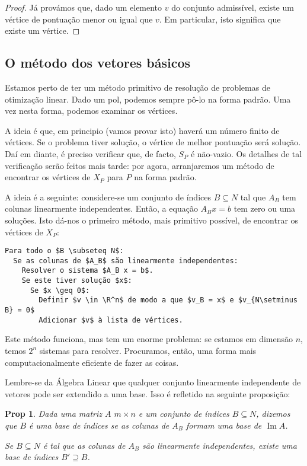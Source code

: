 \documentclass{article}
\DeclareMathOperator{\im}{Im}
\newcommand{\R}{\mathbb{R}}
\newtheorem{prop}{Prop}
\theoremstyle{definition}
\begin{document}
	\begin{proof}
	Já provámos que, dado um elemento $v$ do conjunto admissível, existe um vértice de pontuação menor ou igual que $v$. Em particular, isto significa que existe um vértice.
	\end{proof}
	
	\subsection{O método dos vetores básicos}
	
	Estamos perto de ter um método primitivo de resolução de problemas de otimização linear. Dado um pol, podemos sempre pô-lo na forma padrão. Uma vez nesta forma, podemos examinar os vértices.
	
	A ideia é que, em principio (vamos provar isto) haverá um número finito de vértices. Se o problema tiver solução, o vértice de melhor pontuação será solução. Daí em diante, é preciso verificar que, de facto, $S_P$ é não-vazio. Os detalhes de tal verificação serão feitos mais tarde: por agora, arranjaremos um método de encontrar os vértices de $X_P$ para $P$ na forma padrão.
	
	A ideia é a seguinte: considere-se um conjunto de índices $B \subseteq N$ tal que $A_B$ tem colunas linearmente independentes. Então, a equação $A_B x = b$ tem zero ou uma soluções. Isto dá-nos o primeiro método, mais primitivo possível, de encontrar os vértices de $X_P$:

	\begin{lstlisting}[mathescape=true, keepspaces=true]
Para todo o $B \subseteq N$:
  Se as colunas de $A_B$ são linearmente independentes:
    Resolver o sistema $A_B x = b$.
    Se este tiver solução $x$:
      Se $x \geq 0$:
        Definir $v \in \R^n$ de modo a que $v_B = x$ e $v_{N\setminus B} = 0$
        Adicionar $v$ à lista de vértices.
	\end{lstlisting}
	
	Este método funciona, mas tem um enorme problema: se estamos em dimensão $n$, temos $2^n$ sistemas para resolver. Procuramos, então, uma forma mais computacionalmente eficiente de fazer as coisas.
	
	Lembre-se da Álgebra Linear que qualquer conjunto linearmente independente de vetores pode ser extendido a uma base. Isso é refletido na seguinte proposição:
	
	\begin{prop}
	Dada uma matriz $A$ $m \times n$ e um conjunto de índices $B \subseteq N$, dizemos que $B$ é uma \emph{base de índices} se as colunas de $A_B$ formam uma base de $\im A$.
	
	Se $B \subseteq N$ é tal que as colunas de $A_B$ são linearmente independentes, existe uma base de índices $B' \supseteq B$.
	\end{prop}
	
\end{document}
